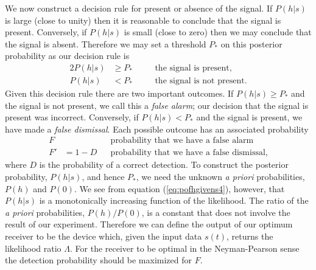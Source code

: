 We now construct a decision rule for present or absence of the signal.  If
$P(h|s)$ is large (close to unity) then it is reasonable to conclude that the
signal is present.  Conversely, if $P(h|s)$ is small (close to zero) then we
may conclude that the signal is absent.  Therefore we may set a threshold
$P_\ast$ on this posterior probability as our decision rule is
\begin{alignat}{2}
P(h|s) &\ge P_* &\quad&\text{the signal is present}, \\
P(h|s) &< P_* &&\text{the signal is not present}.
\end{alignat}
Given this decision rule there are two important outcomes.  If $P(h|s)
\ge P_*$ and the signal is not present, we call this a \emph{false alarm}; our
decision that the signal is present was incorrect. Conversely, if
$P(h|s) < P_*$ and the signal is present, we have made a \emph{false
dismissal}. Each possible outcome has an associated probability
\begin{align}
F  &&&\text{probability that we have a false alarm} \\
F' &= 1 - D &&\text{probability that we have a false dismissal},
\end{align}
where $D$ is the probability of a correct detection.
To construct the posterior probability, $P(h|s)$, and hence $P_\ast$, we need
the unknown \emph{a priori} probabilities, $P(h)$ and $P(0)$. We see from
equation (\ref{eq:pofhgivens4}), however, that $P(h|s)$ is a monotonically
increasing function of the likelihood. The ratio of the \emph{a priori}
probabilities, $P(h)/P(0)$, is a constant that does not involve the result of
our experiment. Therefore we can define the output of our optimum receiver to be
the device which, given the input data $s(t)$, returns the likelihood ratio
$\Lambda$.  For the receiver to be optimal in the Neyman-Pearson sense the
detection probability should be maximized for $F$.  

